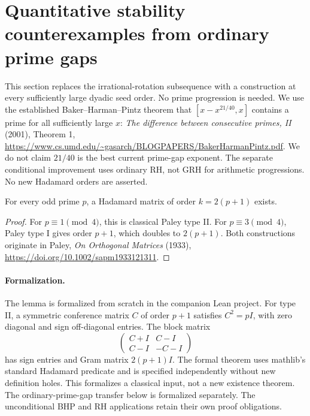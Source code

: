 \section{Quantitative stability counterexamples from ordinary prime gaps}
\label{s26:sec:stability-prime-gaps}
This section replaces the irrational-rotation subsequence with a construction
at every sufficiently large dyadic seed order. No prime progression is
needed. We use the established Baker--Harman--Pintz theorem that
$[x-x^{21/40},x]$ contains a prime for all sufficiently large $x$:
\emph{The difference between consecutive primes, II} (2001), Theorem 1,
\url{https://www.cs.umd.edu/~gasarch/BLOGPAPERS/BakerHarmanPintz.pdf}.
We do not claim $21/40$ is the best current prime-gap exponent.
The separate conditional improvement uses ordinary RH, not GRH for
arithmetic progressions. No new Hadamard orders are asserted.

\begin{lemma}
\label{s26:lem:stability-any-prime}
For every odd prime $p$, a Hadamard matrix of order $k=2(p+1)$ exists.
\end{lemma}
\begin{proof}
For $p\equiv1\pmod4$, this is classical Paley type II. For
$p\equiv3\pmod4$, Paley type I gives order $p+1$, which doubles to
$2(p+1)$. Both constructions originate in Paley,
\emph{On Orthogonal Matrices} (1933),
\url{https://doi.org/10.1002/sapm1933121311}.
\end{proof}

\paragraph{Formalization.}
The lemma is formalized from scratch in the companion Lean project.
For type II, a symmetric conference matrix $C$ of order $p+1$
satisfies $C^2=pI$, with zero diagonal and sign off-diagonal entries.
The block matrix
\[
 \begin{pmatrix} C+I&C-I\\ C-I&-C-I\end{pmatrix}
\]
has sign entries and Gram matrix $2(p+1)I$.
The formal theorem uses mathlib's standard Hadamard predicate and is
specified independently without new definition holes. This formalizes
a classical input, not a new existence theorem. The ordinary-prime-gap transfer below is formalized separately.
The unconditional BHP and RH applications retain their own proof obligations.


